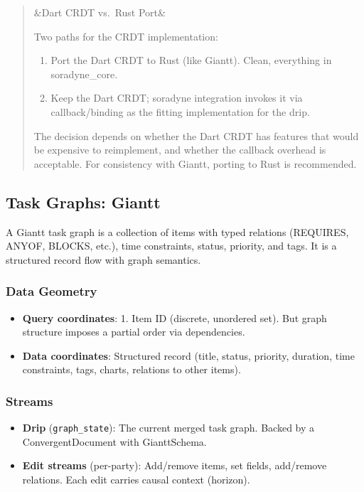 \documentclass[11pt, letterpaper]{article}
\newenvironment{designnote}[1][]
  {\par\medskip\begin{quote}\small
   \ifx&#1&\else\noindent{\bfseries\color{jetcolor} #1}\par\smallskip\fi}
  {\end{quote}\medskip}
\begin{document}
\begin{designnote}[Dart CRDT vs.\ Rust Port]
Two paths for the CRDT implementation:
\begin{enumerate}
  \item Port the Dart CRDT to Rust (like Giantt). Clean, everything in soradyne\_core.
  \item Keep the Dart CRDT; soradyne integration invokes it via callback/binding as
    the fitting implementation for the drip.
\end{enumerate}
The decision depends on whether the Dart CRDT has features that would be expensive to
reimplement, and whether the callback overhead is acceptable. For consistency with
Giantt, porting to Rust is recommended.
\end{designnote}

\subsection{Task Graphs: Giantt}
\label{sec:ex-giantt}

A Giantt task graph is a collection of items with typed relations (REQUIRES, ANYOF,
BLOCKS, etc.), time constraints, status, priority, and tags. It is a structured record
flow with graph semantics.

\subsubsection{Data Geometry}
\begin{itemize}[leftmargin=2em]
  \item \textbf{Query coordinates}: 1. Item ID (discrete, unordered set). But graph
    structure imposes a partial order via dependencies.
  \item \textbf{Data coordinates}: Structured record (title, status, priority, duration,
    time constraints, tags, charts, relations to other items).
\end{itemize}

\subsubsection{Streams}
\begin{itemize}[leftmargin=2em]
  \item \textbf{Drip} (\texttt{graph\_state}): The current merged task graph. Backed
    by a ConvergentDocument with GianttSchema.
  \item \textbf{Edit streams} (per-party): Add/remove items, set fields, add/remove
    relations. Each edit carries causal context (horizon).
\end{itemize}
\end{document}
